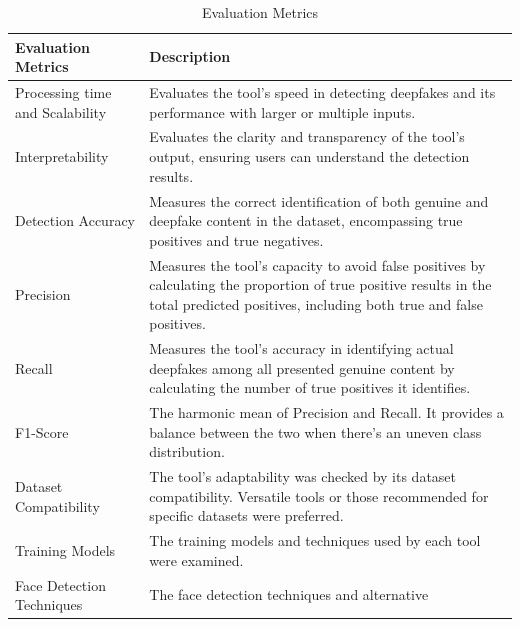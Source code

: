 \begin{table}[htpb]
	\caption{Evaluation Metrics}\label{tab:evaluation_metrics}
	\centering
	\small
	\begin{tabularx}{\textwidth}{l X}
		\toprule
		\textbf{Evaluation Metrics}         & \textbf{Description}                              \\
		\midrule
		Processing time and Scalability     & Evaluates the tool's speed in detecting deepfakes
		and its performance with larger or multiple inputs.                                     \\
		\addlinespace
		Interpretability                    & Evaluates the clarity and transparency of the
		tool's output, ensuring users can understand the detection results.                     \\
		\addlinespace
		Detection Accuracy                  & Measures the correct identification of both
		genuine and deepfake content in the dataset, encompassing true positives and true
		negatives.                                                                              \\
		\addlinespace
		Precision                           & Measures the tool's capacity to avoid false
		positives by calculating the proportion of true positive results in the total
		predicted positives, including both true and false positives.                           \\
		\addlinespace
		Recall                              & Measures the tool's accuracy in identifying
		actual deepfakes among all presented genuine content by calculating the number
		of true positives it identifies.                                                        \\
		\addlinespace
		F1-Score                            & The harmonic mean of Precision and Recall.
		It provides a balance between the two when there's an uneven class distribution.        \\
		\addlinespace
		Dataset Compatibility               & The tool's adaptability was checked by its
		dataset compatibility. Versatile tools or those recommended for specific datasets
		were preferred.                                                                         \\
		\addlinespace
		Training Models                     & The training models and techniques used by
		each tool were examined.                                                                \\
		\addlinespace
		Face Detection Techniques           & The face detection techniques and alternative

\end{tabularx}
\end{table}
